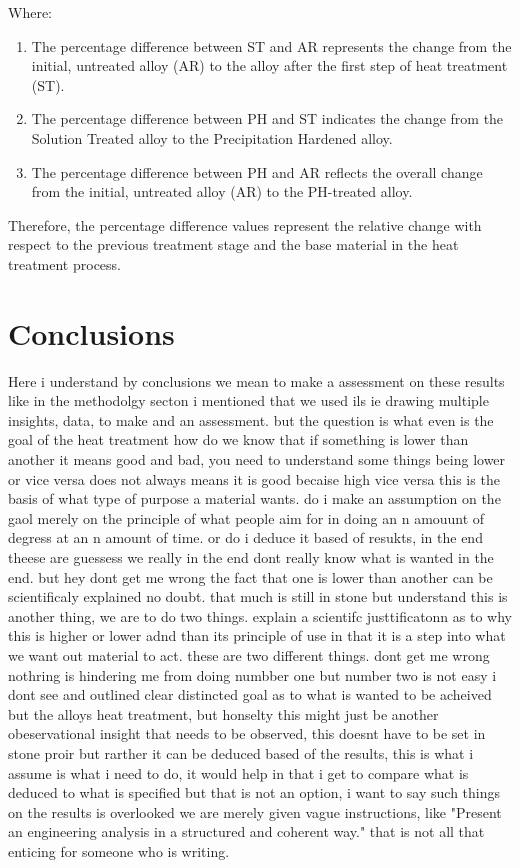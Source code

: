 \documentclass{article}
\begin{document}
Where:
\begin{enumerate}[itemsep=-1mm]
    \item The percentage difference between ST and AR represents the change from the initial, untreated alloy (AR) to the alloy after the first step of heat treatment (ST).
    \item The percentage difference between PH and ST indicates the change from the Solution Treated alloy to the Precipitation Hardened alloy.
    \item The percentage difference between PH and AR reflects the overall change from the initial, untreated alloy (AR) to the PH-treated alloy.
\end{enumerate}
Therefore, the percentage difference values represent the relative change with respect to the previous treatment stage and the base material in the heat treatment process.
  
    \newpage\restoregeometry\vspace*{-30pt}
    \section{Conclusions}\label{discuss}
    Here i understand by conclusions we mean to make a assessment on these results like in the methodolgy secton i mentioned that we used ils ie drawing multiple insights, data, to make and an assessment. but the question is what even is the goal of the heat treatment how do we know that if something is lower than another it means good and bad, you need to understand some things being lower or vice versa does not always means it is good becaise high vice versa this is the basis of what type of purpose a material wants. do i make an assumption on the gaol merely on the principle of what people aim for in doing an n amouunt of degress at an n amount of time. or do i deduce it based of resukts, in the end theese are guessess we really in the end dont really know what is wanted in the end.    
    but hey dont get me wrong the fact that one is lower than another can be scientificaly explained no doubt. that much is still in stone but understand this is another thing, we are to do two things.
    explain a scientifc justtificatonn as to why this is higher or lower adnd than its principle of use in that it is a step into what we want out material to act. these are two different things. dont get me wrong nothring is hindering me from doing numbber one but number two is not easy i dont see and outlined clear distincted goal as to what is wanted to be acheived but the alloys heat treatment, but honselty this might just be another obeservational insight that needs to be observed, this doesnt have to be set in stone proir but rarther it can be deduced based of the results, this is what i assume is what i need to do, it would help in that i get to compare what is deduced to what is specified but that is not an option, i want to say such things on the results is overlooked we are merely given vague instructions, like  "Present an engineering analysis in a structured and coherent way." that is not all that enticing for someone who is writing.
    
\end{document}
